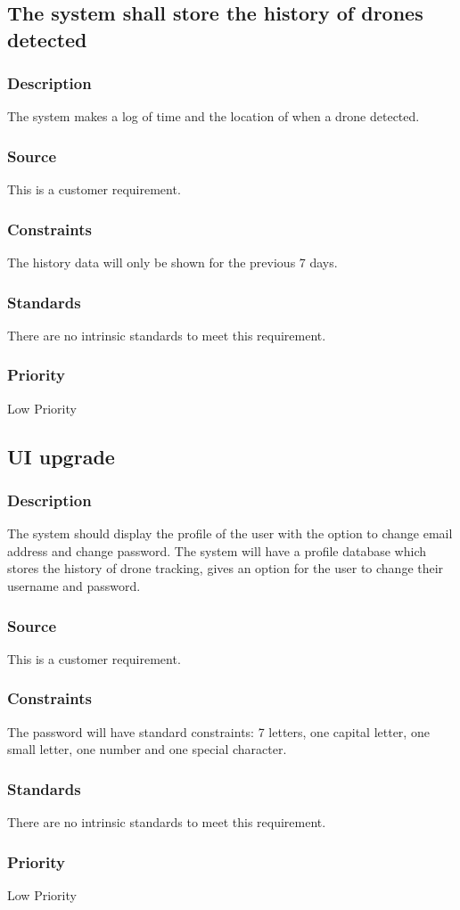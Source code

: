\subsection{The system shall store the history of drones detected}
\subsubsection{Description}
The system makes a log of time and the location of when a drone detected.
\subsubsection{Source}
This is a customer requirement.
\subsubsection{Constraints}
The history data will only be shown for the previous 7 days.
\subsubsection{Standards}
There are no intrinsic standards to meet this requirement.
\subsubsection{Priority}
Low Priority

\subsection{UI upgrade}
\subsubsection{Description}
The system should display the profile of the user with the option to change email address and change password. The system will have a profile database which stores the history of drone tracking, gives an option for the user to change their username and password.
\subsubsection{Source}
This is a customer requirement.
\subsubsection{Constraints}
The password will have standard constraints: 7 letters, one capital letter, one small letter, one number and one special character.
\subsubsection{Standards}
There are no intrinsic standards to meet this requirement.
\subsubsection{Priority}
Low Priority
